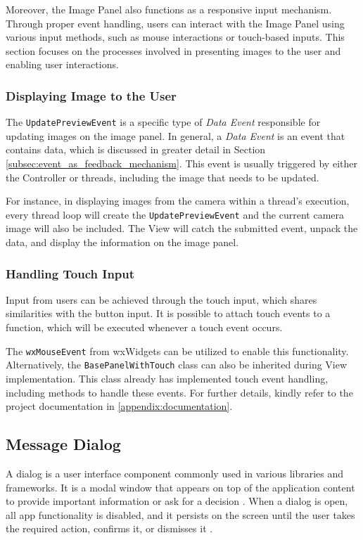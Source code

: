 Moreover, the Image Panel also functions as a responsive input mechanism. Through proper event handling, users can interact with the Image Panel using various input methods, such as mouse interactions or touch-based inputs. This section focuses on the processes involved in presenting images to the user and enabling user interactions.

\subsubsection{Displaying Image to the User}
The \texttt{UpdatePreviewEvent} is a specific type of \textit{Data Event} responsible for updating images on the image panel. In general, a \textit{Data Event} is an event that contains data, which is discussed in greater detail in Section \ref{subsec:event_as_feedback_mechanism}. This event is usually triggered by either the Controller or threads, including the image that needs to be updated.

For instance, in displaying images from the camera within a thread's execution, every thread loop will create the \texttt{UpdatePreviewEvent} and the current camera image will also be included. The View will catch the submitted event, unpack the data, and display the information on the image panel.

\subsubsection{Handling Touch Input}
\label{subsubsec:handling_touch_input}
Input from users can be achieved through the touch input, which shares similarities with the button input. It is possible to attach touch events to a function, which will be executed whenever a touch event occurs.

The \texttt{wxMouseEvent} from wxWidgets can be utilized to enable this functionality. Alternatively, the \texttt{BasePanelWithTouch} class can also be inherited during View implementation. This class already has implemented touch event handling, including methods to handle these events. For further details, kindly refer to the project documentation in \ref{appendix:documentation}.

\subsection{Message Dialog}
\label{subsec:message_dialog}

A dialog is a user interface component commonly used in various libraries and frameworks. It is a modal window that appears on top of the application content to provide important information or ask for a decision \cite{Bay_2022}. When a dialog is open, all app functionality is disabled, and it persists on the screen until the user takes the required action, confirms it, or dismisses it \cite{Bay_2022}.

